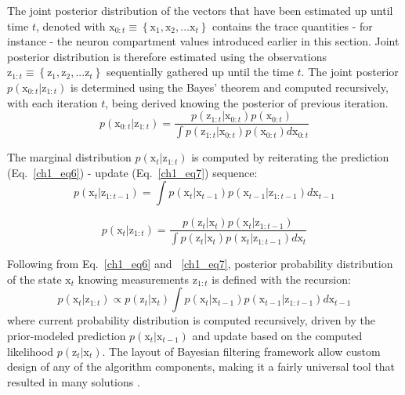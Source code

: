 The joint posterior distribution of the vectors that have been estimated up until time $t$, denoted with $\mathrm{x}_{0:t} \equiv \left\lbrace \mathrm{x}_1, \mathrm{x}_2, ... \mathrm{x}_t \right\rbrace  $ contains the trace quantities - for instance - the neuron compartment values introduced earlier in this section. Joint posterior distribution is therefore estimated using the observations $\mathrm{z}_{1:t} \equiv \left\lbrace \mathrm{z}_1, \mathrm{z}_2, ... \mathrm{z}_t \right\rbrace $ sequentially gathered up until the time $t$. The joint posterior $ p(\mathrm{x}_{0:t} | \mathrm{z}_{1:t}) $ is determined using the Bayes' theorem \cite{doucet2001introduction,ristic2004beyond} and computed recursively, with each iteration $t$, being derived knowing the posterior of previous iteration.
\begin{equation}
p(\mathrm{x}_{0:t} | \mathrm{z}_{1:t}) = \frac{p(\mathrm{z}_{1:t} | \mathrm{x}_{0:t}) p(\mathrm{x}_{0:t})}{\int p(\mathrm{z}_{1:t} | \mathrm{x}_{0:t}) p(\mathrm{x}_{0:t}) d\mathrm{x}_{0:t} }
\label{ch1_eq5}
\end{equation}
 
The marginal distribution $ p(\mathrm{x}_t | \mathrm{z}_{1:t}) $ is computed by reiterating the prediction (Eq.~\ref{ch1_eq6}) - update (Eq.~\ref{ch1_eq7}) sequence:
\begin{equation}
p(\mathrm{x}_t | \mathrm{z}_{1:t-1}) = \int p(\mathrm{x}_t | \mathrm{x}_{t-1}) p(\mathrm{x}_{t-1} | \mathrm{z}_{1:t-1}) d\mathrm{x}_{t-1}
\label{ch1_eq6}
\end{equation}

\begin{equation}
p(\mathrm{x}_t | \mathrm{z}_{1:t}) = \frac{p(\mathrm{z}_t | \mathrm{x}_t) p(\mathrm{x}_t | \mathrm{z}_{1:t-1})}{ \int p(\mathrm{z}_t | \mathrm{x}_t) p(\mathrm{x}_t | \mathrm{z}_{1:t-1}) d\mathrm{x}_t}
\label{ch1_eq7}
\end{equation} 

Following from Eq.~\ref{ch1_eq6} and ~\ref{ch1_eq7}, posterior probability distribution of the state $\mathrm{x}_t$ knowing measurements $\mathrm{z}_{1:t}$ is defined with the recursion:  
\begin{equation}
p(\mathrm{x}_t | \mathrm{z}_{1:t}) \propto p(\mathrm{z}_t | \mathrm{x}_t) \int p(\mathrm{x}_t | \mathrm{x}_{t-1}) p(\mathrm{x}_{t-1} | \mathrm{z}_{1:t-1}) d\mathrm{x}_{t-1}
\label{ch1_eq8}
\end{equation}
where current probability distribution is computed recursively, driven by the prior-modeled prediction $p(\mathrm{x}_t | \mathrm{x}_{t-1})$ and update based on the computed likelihood $p(\mathrm{z}_t | \mathrm{x}_t)$. The layout of Bayesian filtering framework allow custom design of any of the algorithm components, making it a fairly universal tool that resulted in many solutions \cite{sarkka2013bayesian}.    

